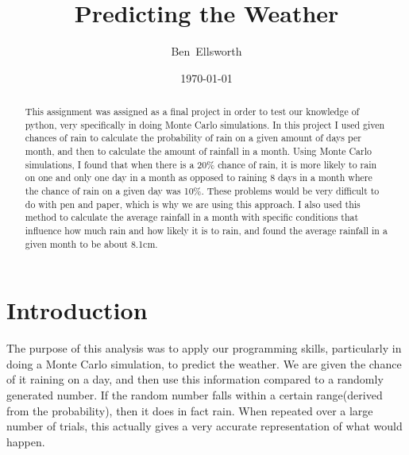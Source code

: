 \documentclass[twocolumn]{revtex4}
\begin{document}
\title{
Predicting the Weather
}
\author{Ben~Ellsworth}
\date{\today}

\begin{abstract}
This assignment was assigned as a final project in order to test our knowledge of python, very specifically in doing Monte Carlo simulations. In this project I used given chances of rain to calculate the probability of rain on a given amount of days per month, and then to calculate the amount of rainfall in a month. Using Monte Carlo simulations, I found that when there is a 20\% chance of rain, it is more likely to rain on one and only one day in a month as opposed to raining 8 days in a month where the chance of rain on a given day was 10\%. These problems would be very difficult to do with pen and paper, which is why we are using this approach. I also used this method to calculate the average rainfall in a month with specific conditions that influence how much rain and how likely it is to rain, and found the average rainfall in a given month to be about 8.1cm. 
\end{abstract}

\maketitle

\section{Introduction}
The purpose of this analysis was to apply our programming skills, particularly in doing a Monte Carlo simulation, to predict the weather. We are given the chance of it raining on a day, and then use this information compared to a randomly generated number. If the random number falls within a certain range(derived from the probability), then it does in fact rain. When repeated over a large number of trials, this actually gives a very accurate representation of what would happen. 


\end{document}
